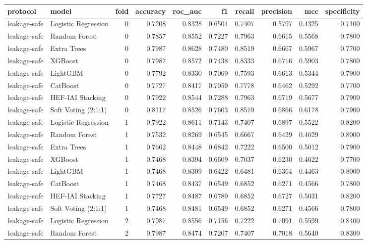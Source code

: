 \begin{tabular}{llrrrrrrrr}
\toprule
protocol & model & fold & accuracy & roc\_auc & f1 & recall & precision & mcc & specificity \\
\midrule
leakage-safe & Logistic Regression & 0 & 0.7208 & 0.8328 & 0.6504 & 0.7407 & 0.5797 & 0.4325 & 0.7100 \\
leakage-safe & Random Forest & 0 & 0.7857 & 0.8552 & 0.7227 & 0.7963 & 0.6615 & 0.5568 & 0.7800 \\
leakage-safe & Extra Trees & 0 & 0.7987 & 0.8628 & 0.7480 & 0.8519 & 0.6667 & 0.5967 & 0.7700 \\
leakage-safe & XGBoost & 0 & 0.7987 & 0.8572 & 0.7438 & 0.8333 & 0.6716 & 0.5903 & 0.7800 \\
leakage-safe & LightGBM & 0 & 0.7792 & 0.8330 & 0.7069 & 0.7593 & 0.6613 & 0.5344 & 0.7900 \\
leakage-safe & CatBoost & 0 & 0.7727 & 0.8417 & 0.7059 & 0.7778 & 0.6462 & 0.5292 & 0.7700 \\
leakage-safe & HEF-IAI Stacking & 0 & 0.7922 & 0.8544 & 0.7288 & 0.7963 & 0.6719 & 0.5677 & 0.7900 \\
leakage-safe & Soft Voting (2:1:1) & 0 & 0.8117 & 0.8526 & 0.7603 & 0.8519 & 0.6866 & 0.6178 & 0.7900 \\
leakage-safe & Logistic Regression & 1 & 0.7922 & 0.8611 & 0.7143 & 0.7407 & 0.6897 & 0.5522 & 0.8200 \\
leakage-safe & Random Forest & 1 & 0.7532 & 0.8269 & 0.6545 & 0.6667 & 0.6429 & 0.4629 & 0.8000 \\
leakage-safe & Extra Trees & 1 & 0.7662 & 0.8448 & 0.6842 & 0.7222 & 0.6500 & 0.5012 & 0.7900 \\
leakage-safe & XGBoost & 1 & 0.7468 & 0.8394 & 0.6609 & 0.7037 & 0.6230 & 0.4622 & 0.7700 \\
leakage-safe & LightGBM & 1 & 0.7468 & 0.8309 & 0.6422 & 0.6481 & 0.6364 & 0.4463 & 0.8000 \\
leakage-safe & CatBoost & 1 & 0.7468 & 0.8437 & 0.6549 & 0.6852 & 0.6271 & 0.4566 & 0.7800 \\
leakage-safe & HEF-IAI Stacking & 1 & 0.7727 & 0.8487 & 0.6789 & 0.6852 & 0.6727 & 0.5031 & 0.8200 \\
leakage-safe & Soft Voting (2:1:1) & 1 & 0.7468 & 0.8481 & 0.6549 & 0.6852 & 0.6271 & 0.4566 & 0.7800 \\
leakage-safe & Logistic Regression & 2 & 0.7987 & 0.8556 & 0.7156 & 0.7222 & 0.7091 & 0.5599 & 0.8400 \\
leakage-safe & Random Forest & 2 & 0.7987 & 0.8474 & 0.7207 & 0.7407 & 0.7018 & 0.5640 & 0.8300 \\

\end{tabular}
